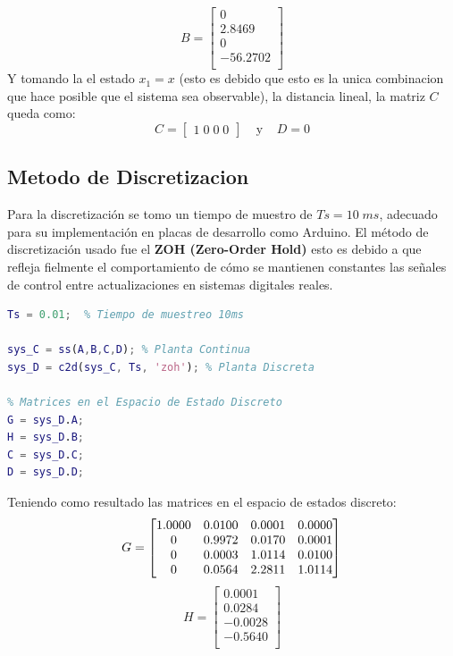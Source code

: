 \documentclass[final,times,twocolumn,5p]{ResumenEjecutivo}
\begin{document}
\[
B=
\begin{bmatrix}
         0\\
    2.8469\\
         0\\
  -56.2702\\
\end{bmatrix}
\]
Y tomando la el estado $x_1=x$ (esto es debido que esto es la unica combinacion que hace posible que el sistema sea observable), la distancia lineal, la matriz $C$ queda como:
\[
C=
\begin{bmatrix}
1\;0\;0\;0
\end{bmatrix}
\;\;\;\;\text{y}\;\;\;\;D=0
\]
\subsection{Metodo de Discretizacion}
Para la discretización se tomo un tiempo de muestro de $Ts=10\;ms$, adecuado para su implementación en placas de desarrollo como Arduino. El método de discretización usado fue el \textbf{ZOH (Zero-Order Hold)} esto es debido a que refleja fielmente el comportamiento de cómo se mantienen constantes las señales de control entre actualizaciones en sistemas digitales reales.\\
\begin{lstlisting}[language=Matlab]
%% 2. DISCRETIZACIÓN
Ts = 0.01;  % Tiempo de muestreo 10ms

sys_C = ss(A,B,C,D); % Planta Continua
sys_D = c2d(sys_C, Ts, 'zoh'); % Planta Discreta

% Matrices en el Espacio de Estado Discreto
G = sys_D.A; 
H = sys_D.B;
C = sys_D.C;
D = sys_D.D;
\end{lstlisting}
Teniendo como resultado las matrices en el espacio de estados discreto:
\[
G=
\begin{bmatrix}
    1.0000  &  0.0100 &  0.0001  &  0.0000\\
         0  &  0.9972  &  0.0170 &   0.0001\\
         0  &  0.0003  &  1.0114  &  0.0100\\
         0  &  0.0564  &  2.2811  &  1.0114\\
\end{bmatrix}\\
\]
\[
H=
\begin{bmatrix}
    0.0001\\
    0.0284\\
   -0.0028\\
   -0.5640\\
\end{bmatrix}
\]
\end{document}
